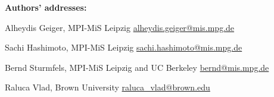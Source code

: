 \documentclass[12pt]{extarticle}
\theoremstyle{definition}
\numberwithin{theorem}{section}
\theoremstyle{plain}\newtheorem{ithm}{Theorem}
\begin{document}
\bigskip
 \bigskip


\noindent
\footnotesize
{\bf Authors' addresses:}

\smallskip


\noindent Alheydis Geiger,
MPI-MiS Leipzig
\hfill \url{alheydis.geiger@mis.mpg.de}


\noindent Sachi Hashimoto,
MPI-MiS Leipzig %
\hfill \url{sachi.hashimoto@mis.mpg.de}


\noindent Bernd Sturmfels,
MPI-MiS Leipzig  and UC Berkeley
\hfill \url{bernd@mis.mpg.de}


\noindent Raluca Vlad,
Brown University
\hfill \url{raluca_vlad@brown.edu}
\end{document}
